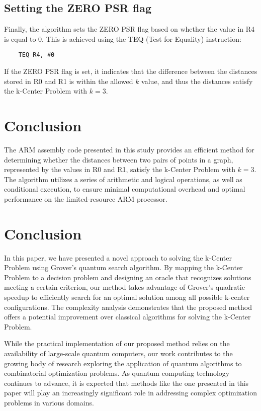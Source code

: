 \subsection{Setting the ZERO PSR flag}

Finally, the algorithm sets the ZERO PSR flag based on whether the value in R4 is equal to 0. This is achieved using the TEQ (Test for Equality) instruction:

\begin{verbatim}
    TEQ R4, #0
\end{verbatim}

If the ZERO PSR flag is set, it indicates that the difference between the distances stored in R0 and R1 is within the allowed $k$ value, and thus the distances satisfy the k-Center Problem with $k=3$.

\section{Conclusion}

The ARM assembly code presented in this study provides an efficient method for determining whether the distances between two pairs of points in a graph, represented by the values in R0 and R1, satisfy the k-Center Problem with $k=3$. The algorithm utilizes a series of arithmetic and logical operations, as well as conditional execution, to ensure minimal computational overhead and optimal performance on the limited-resource ARM processor.

\section{Conclusion}
\label{sec:conclusion}

In this paper, we have presented a novel approach to solving the k-Center Problem using Grover's quantum search algorithm. By mapping the k-Center Problem to a decision problem and designing an oracle that recognizes solutions meeting a certain criterion, our method takes advantage of Grover's quadratic speedup to efficiently search for an optimal solution among all possible k-center configurations. The complexity analysis demonstrates that the proposed method offers a potential improvement over classical algorithms for solving the k-Center Problem.

While the practical implementation of our proposed method relies on the availability of large-scale quantum computers, our work contributes to the growing body of research exploring the application of quantum algorithms to combinatorial optimization problems. As quantum computing technology continues to advance, it is expected that methods like the one presented in this paper will play an increasingly significant role in addressing complex optimization problems in various domains.

